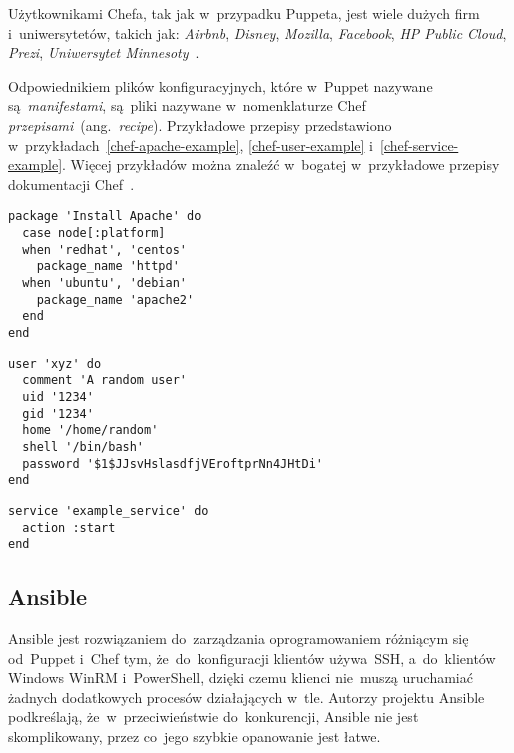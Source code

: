 \documentclass[thesis]{subfiles}
\begin{document}
Użytkownikami Chefa, tak jak w~przypadku Puppeta, jest wiele dużych firm i~uniwersytetów, takich jak: \emph{Airbnb}, \emph{Disney}, \emph{Mozilla}, \emph{Facebook}, \emph{HP Public Cloud}, \emph{Prezi}, \emph{Uniwersytet Minnesoty}~\cite{chef-customers,puppet-chef-disney}.

Odpowiednikiem plików konfiguracyjnych, które w~Puppet nazywane są~\emph{manifestami}, są~pliki nazywane w~nomenklaturze Chef \emph{przepisami}~(ang.~\emph{recipe}). Przykładowe przepisy przedstawiono w~przykładach~\ref{chef-apache-example}, \ref{chef-user-example} i~\ref{chef-service-example}. Więcej przykładów można znaleźć w~bogatej w~przykładowe przepisy dokumentacji Chef~\cite{chef-examples}.

\begin{lstlisting}[numbers=none,caption={Przepis Chef gwarantujący, że serwer Apache zostanie zainstalowany niezależnie od~tego jak~się~nazywa paczka oprogramowania go~dostarczająca},label=chef-apache-example]
package 'Install Apache' do
  case node[:platform]
  when 'redhat', 'centos'
    package_name 'httpd'
  when 'ubuntu', 'debian'
    package_name 'apache2'
  end
end
\end{lstlisting}

\begin{lstlisting}[numbers=none,caption={Przepis Chef gwarantujący, że użytkownik \texttt{xyz} istnieje w~systemie i~ma zadane ustawienia konta},label=chef-user-example]
user 'xyz' do
  comment 'A random user'
  uid '1234'
  gid '1234'
  home '/home/random'
  shell '/bin/bash'
  password '$1$JJsvHslasdfjVEroftprNn4JHtDi'
end
\end{lstlisting}

\begin{lstlisting}[numbers=none,caption={Przepis Chef gwarantujący, że serwis \texttt{example\_service} jest uruchomiony},label=chef-service-example]
service 'example_service' do
  action :start
end
\end{lstlisting}


\subsection{Ansible}

Ansible jest rozwiązaniem do~zarządzania oprogramowaniem różniącym się od~Puppet i~Chef tym, że~do~konfiguracji klientów  używa~SSH, a~do~klientów Windows WinRM i~PowerShell, dzięki czemu klienci nie~muszą uruchamiać żadnych dodatkowych procesów działających w~tle. Autorzy projektu Ansible podkreślają, że~w~przeciwieństwie do~konkurencji, Ansible nie jest skomplikowany, przez co~jego szybkie opanowanie jest łatwe.
\end{document}
